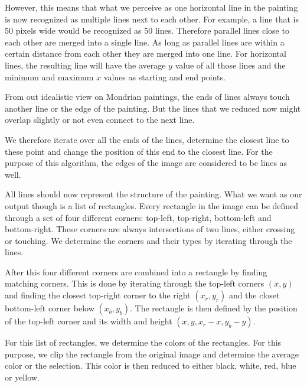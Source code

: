 However, this means that what we perceive as one horizontal line in the painting
is now recognized as multiple lines next to each other. For example, a line that
is 50 pixels wide would be recognized as 50 lines. Therefore parallel lines
close to each other are merged into a single line. As long as parallel lines are
within a certain distance from each other they are merged into one line. For
horizontal lines, the resulting line will have the average $y$ value of all
those lines and the minimum and maximum $x$ values as starting and end points.

From out idealistic view on Mondrian paintings, the ends of lines always touch
another line or the edge of the painting. But the lines that we reduced now
might overlap slightly or not even connect to the next line.

We therefore iterate over all the ends of the lines, determine the closest line
to these point and change the position of this end to the closest line. For the
purpose of this algorithm, the edges of the image are considered to be lines as
well.

All lines should now represent the structure of the painting. What we want as
our output though is a list of rectangles. Every rectangle in the image can be
defined through a set of four different corners: top-left, top-right,
bottom-left and bottom-right. These corners are always intersections of two
lines, either crossing or touching. We determine the corners and their types by
iterating through the lines.

After this four different corners are combined into a rectangle by finding
matching corners. This is done by iterating through the top-left corners $(x,y)$
and finding the closest top-right corner to the right $(x_r, y_r)$ and the
closet bottom-left corner below $(x_b, y_b)$. The rectangle is then defined by
the position of the top-left corner and its width and height
$(x,y,x_r-x,y_b-y)$.

For this list of rectangles, we determine the colors of the rectangles. For this
purpose, we clip the rectangle from the original image and determine the average
color or the selection. This color is then reduced to either black, white, red,
blue or yellow.
